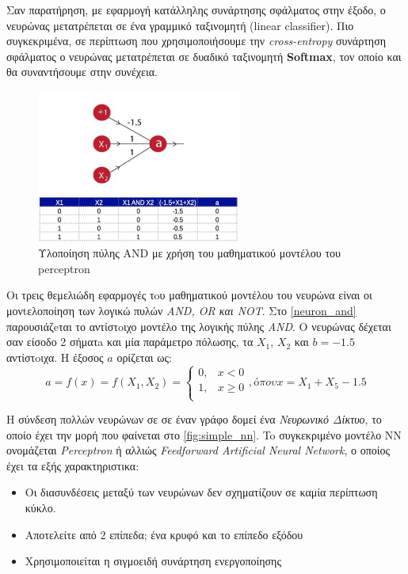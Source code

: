 Σαν παρατήρηση, με εφαρμογή κατάλληλης
συνάρτησης σφάλματος στην έξοδο, ο νευρώνας μετατρέπεται σε ένα  γραμμικό ταξινομητή
(linear classifier). Πιο συγκεκριμένα, σε περίπτωση που χρησιμοποιήσουμε την \emph{cross-entropy}
συνάρτηση σφάλματος ο νευρώνας μετατρέπεται σε δυαδικό ταξινομητή \textbf{Softmax},
τον οποίο και θα συναντήσουμε στην συνέχεια.

\begin{figure}[!ht]
  \centering
  \includegraphics[width=0.6\textwidth]{./images/chapter3/perceptron_and.jpg}
  \caption[Υλοποίηση πύλης AND με χρήση του μαθηματικού μοντέλου του perceptron]{Υλοποίηση πύλης AND με χρήση του μαθηματικού μοντέλου του perceptron}
  \label{fig:neuron_and}
\end{figure}

Οι τρεις θεμελιώδη εφαρμογές τoυ μαθηματικού μοντέλου του νευρώνα είναι οι
μονtελοποίηση των λογικώ πυλών \emph{AND, OR και NOT}. Στο \autoref{neuron_and}
παρουσιάζeται το αντίστoιχο μοντέλο της λογικής πύλης \emph{AND}. Ο νευρώνας
δέχεται σαν είσοδο 2 σήματa και μία παράμετρο πόλωσης,
τα $X_{1}$,  $X_{2}$ και $b=-1.5$ αντίστoιχα. Η έξοσος $a$ ορίζεται ως:
\[
  a = f(x) = f(X_{1}, X_{2}) =
  \begin{cases}
    0, & x < 0 \\
    1, & x \geq 0 \\
  \end{cases},  
  όπου x = X_{1} + X_{5} - 1.5
\]

H σύνδεση πολλών νευρώνων σε σε έναν γράφο δομεί ένα \emph{Νευρωνικό Δίκτυο},
το οποίο έχει την μορή που φαίνεται στο \autoref{fig:simple_nn}.
To συγκεκριμένο μοντέλο ΝΝ ονομάζεται \emph{Perceptron} ή αλλιώς
\emph{Feedforward Artificial Neural Network}, ο οποίος έχει τα εξής χαρακτηριστικα:
\begin{itemize}
  \item{Οι διασυνδέσεις μεταξύ των νευρώνων δεν σχηματίζουν σε καμία περίπτωση κύκλο.}
  \item{Αποτελείτε από 2 επίπεδα; ένα κρυφό και το επίπεδο εξόδου}
  \item{Χρησιμοποιείται η σιγμοειδή συνάρτηση ενεργοποίησης}
\end{itemize}

